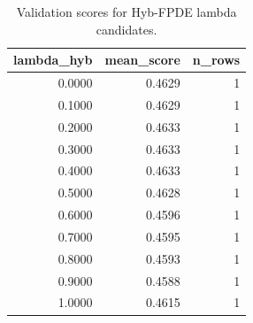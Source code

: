 \begin{table}[t]
\caption{Validation scores for Hyb-FPDE lambda candidates.}
\label{tab:lambda_distribution_computed}
\centering
\begin{tabular}{rrr}
\toprule
lambda\_hyb & mean\_score & n\_rows \\
\midrule
0.0000 & 0.4629 & 1 \\
0.1000 & 0.4629 & 1 \\
0.2000 & 0.4633 & 1 \\
0.3000 & 0.4633 & 1 \\
0.4000 & 0.4633 & 1 \\
0.5000 & 0.4628 & 1 \\
0.6000 & 0.4596 & 1 \\
0.7000 & 0.4595 & 1 \\
0.8000 & 0.4593 & 1 \\
0.9000 & 0.4588 & 1 \\
1.0000 & 0.4615 & 1 \\
\bottomrule
\end{tabular}

\end{table}
